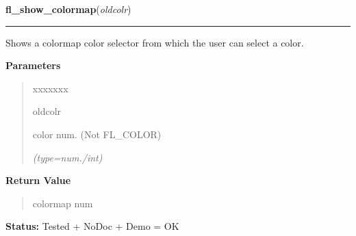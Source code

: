     \label{xformslib:library:fl_show_colormap}

    \vspace{0.5ex}

\hspace{.8\funcindent}\begin{boxedminipage}{\funcwidth}

    \raggedright \textbf{fl\_show\_colormap}(\textit{oldcolr})

    \vspace{-1.5ex}

    \rule{\textwidth}{0.5\fboxrule}
\setlength{\parskip}{2ex}
    Shows a colormap color selector from which the user can select a color.

\setlength{\parskip}{1ex}
      \textbf{Parameters}
      \vspace{-1ex}

      \begin{quote}
        \begin{Ventry}{xxxxxxx}

          \item[oldcolr]

          color num. (Not FL\_COLOR)

            {\it (type=num./int)}

        \end{Ventry}

      \end{quote}

      \textbf{Return Value}
    \vspace{-1ex}

      \begin{quote}
      colormap num

      \end{quote}

\textbf{Status:} Tested + NoDoc + Demo = OK



    \end{boxedminipage}

    \label{xformslib:library:fl_show_choices}

    \vspace{0.5ex}

